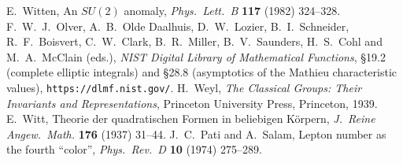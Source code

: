  E.~Witten, An $SU(2)$ anomaly, \emph{Phys.\ Lett.\ B} \textbf{117} (1982) 324--328.
 F.~W.~J.~Olver, A.~B.~Olde Daalhuis, D.~W.~Lozier, B.~I.~Schneider, R.~F.~Boisvert, C.~W.~Clark, B.~R.~Miller, B.~V.~Saunders, H.~S.~Cohl and M.~A.~McClain (eds.), \emph{NIST Digital Library of Mathematical Functions}, \S19.2 (complete elliptic integrals) and \S28.8 (asymptotics of the Mathieu characteristic values), \texttt{https://dlmf.nist.gov/}.
 H.~Weyl, \emph{The Classical Groups: Their Invariants and Representations}, Princeton University Press, Princeton, 1939.
 E.~Witt, Theorie der quadratischen Formen in beliebigen K\"orpern, \emph{J.\ Reine Angew.\ Math.} \textbf{176} (1937) 31--44.
 J.~C.~Pati and A.~Salam, Lepton number as the fourth ``color'', \emph{Phys.\ Rev.\ D} \textbf{10} (1974) 275--289.
